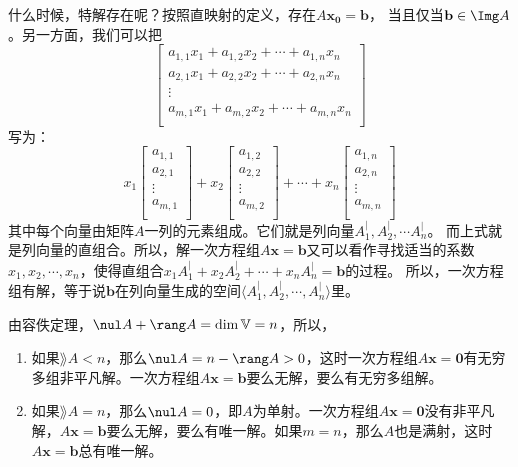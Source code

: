 \documentclass[12pt,UTF8,fontset=none]{ctexbook}
\begin{document}
什么时候，特解存在呢？按照直映射的定义，存在$A\mathbf{x_0} = \mathbf{b}$，
当且仅当$\mathbf{b} \in \Img A$。另一方面，我们可以把
$$
    \begin{bmatrix}
        a_{1,1} x_1 + a_{1,2} x_2 + \cdots + a_{1,n} x_n \\
        a_{2,1} x_1 + a_{2,2} x_2 + \cdots + a_{2,n} x_n \\
        \vdots \\
        a_{m,1} x_1 + a_{m,2} x_2 + \cdots + a_{m,n} x_n \\
    \end{bmatrix}
$$
写为：
$$
    x_1 \begin{bmatrix}
        a_{1,1} \\
        a_{2,1} \\
        \vdots \\
        a_{m,1} \\
    \end{bmatrix} + x_2 \begin{bmatrix}
        a_{1,2} \\
        a_{2,2} \\
        \vdots \\
        a_{m,2}  \\
    \end{bmatrix} + \cdots + x_n \begin{bmatrix}
        a_{1,n} \\
        a_{2,n} \\
        \vdots \\
        a_{m,n}  \\
    \end{bmatrix}
$$
其中每个向量由矩阵$A$一列的元素组成。它们就是列向量$A_1^|, A_2^|, \cdots A_n^|$。
而上式就是列向量的直组合。所以，解一次方程组$A\mathbf{x} = \mathbf{b}$又可以看作寻找适当的系数
$x_1, x_2, \cdots , x_n$，使得直组合$x_1 A_1^| + x_2 A_2^| + \cdots + x_n A_n^| = \mathbf{b}$的过程。
所以，一次方程组有解，等于说$\mathbf{b}$在列向量生成的空间$\langle A_1^|, A_2^|, \cdots, A_n^| \rangle$里。

由容佚定理，$\nul A + \rang A = \dim \mathbb{V} = n$，所以，
\begin{enumerate}
    \item 如果$\rang A < n$，那么$\nul A = n - \rang A > 0$，这时一次方程组$A\mathbf{x} = \mathbf{0}$有无穷多组非平凡解。一次方程组$A\mathbf{x} = \mathbf{b}$要么无解，要么有无穷多组解。
    \item 如果$\rang A = n$，那么$\nul A = 0$，即$A$为单射。一次方程组$A\mathbf{x} = \mathbf{0}$没有非平凡解，$A\mathbf{x} = \mathbf{b}$要么无解，要么有唯一解。如果$m=n$，那么$A$也是满射，这时$A\mathbf{x} = \mathbf{b}$总有唯一解。
\end{enumerate}
\end{document}

